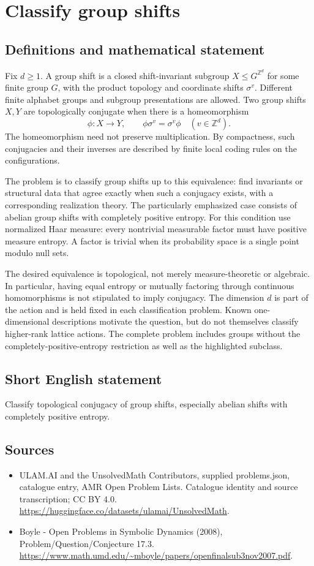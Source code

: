 \documentclass[11pt,a4paper]{article}
\begin{document}
\section*{Classify group shifts}\label{statement}

\subsection{Definitions and mathematical statement}
Fix $d\ge1$. A group shift is a closed shift-invariant subgroup
$X\le G^{\mathbb Z^d}$ for some finite group $G$, with the product
topology and coordinate shifts $\sigma^v$. Different finite alphabet
groups and subgroup presentations are allowed. Two group shifts $X,Y$
are topologically conjugate when there is a homeomorphism
\[
 \phi:X\to Y,\qquad \phi\sigma^v=\sigma^v\phi
       \quad(v\in\mathbb Z^d).
\]
The homeomorphism need not preserve multiplication. By compactness,
such conjugacies and their inverses are described by finite local
coding rules on the configurations.

The problem is to classify group shifts up to this equivalence: find
invariants or structural data that agree exactly when such a conjugacy
exists, with a corresponding realization theory. The particularly
emphasized case consists of abelian group shifts with completely positive
entropy. For this condition use normalized Haar measure: every
nontrivial measurable factor must have positive measure entropy.
A factor is trivial when its probability space is a single point modulo
null sets.

The desired equivalence is topological, not merely measure-theoretic or
algebraic. In particular, having equal entropy or mutually factoring
through continuous homomorphisms is not stipulated to imply conjugacy.
The dimension $d$ is part of the action and is held fixed in each
classification problem. Known one-dimensional descriptions motivate the
question, but do not themselves classify higher-rank lattice actions.
The complete problem includes groups without the completely-positive-entropy
restriction as well as the highlighted subclass.
\subsection{Short English statement}
Classify topological conjugacy of group shifts, especially abelian shifts with completely positive entropy.
\subsection{Sources}
\begin{itemize}
\item[S1] ULAM.AI and the UnsolvedMath Contributors, supplied problems.json, catalogue entry, AMR Open Problem Lists. Catalogue identity and source transcription; CC BY 4.0.
\url{https://huggingface.co/datasets/ulamai/UnsolvedMath}.
\item[S2] Boyle - Open Problems in Symbolic Dynamics (2008), Problem/Question/Conjecture 17.3. 
\url{https://www.math.umd.edu/~mboyle/papers/openfinalsub3nov2007.pdf}.
\end{itemize}
\end{document}
